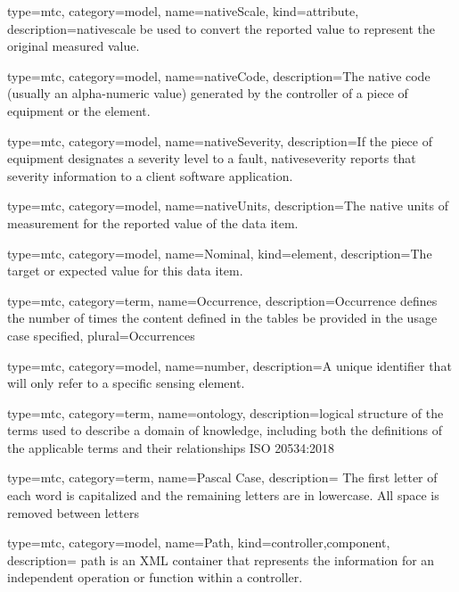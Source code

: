 {
  type=mtc,
  category=model,
  name={nativeScale},
  kind={attribute},
  description={\gls{nativescale} \MAY be used to convert the reported value to represent the original measured value.}
}


{
  type=mtc,
  category=model,
  name={nativeCode},
  description={The native code (usually an alpha-numeric value) generated by the controller of a piece of equipment or the element.}
}


{
  type=mtc,
  category=model,
  name={nativeSeverity},
  description={If the piece of equipment designates a severity level to a fault, \gls{nativeseverity} reports that severity information to a client software application. }
}


{
  type=mtc,
  category=model,
  name={nativeUnits},
  description={The native units of measurement for the reported value of the data item.}
}



{
  type=mtc,
  category=model,
  name={Nominal},
  kind={element},
  description={The target or expected value for this data item.}
}


{
  type=mtc,
  category=term,
  name={Occurrence},
  description={Occurrence defines the number of times the content defined in the tables \MAY be provided in the usage case specified},
  plural={Occurrences}
}


{
  type=mtc,
  category=model,
  name={number},
  description={A unique identifier that will only refer to a specific \gls{sensing element}.}
}


{
  type=mtc,
  category=term,
  name={ontology},
  description={logical structure of the terms used to describe a domain of knowledge, including both the definitions of the applicable terms and their relationships ISO 20534:2018}
}


{
  type=mtc,
  category=term,
  name={Pascal Case},
  description= {The first letter of each word is capitalized and the remaining letters are in lowercase. All space is removed between letters}
}


{
  type=mtc,
  category=model,
  name={Path},
  kind={controller,component},
  description= {\gls{path} is an XML container that represents the information for an independent operation or function within a \gls{controller}.}
}


